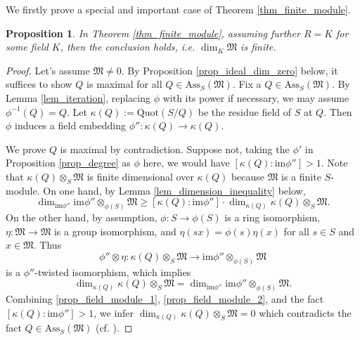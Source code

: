 \documentclass[12pt]{amsart}
\theoremstyle{plain}
\newtheorem{proposition}[theorem]{Proposition}
\theoremstyle{definition}
\theoremstyle{question}
\theoremstyle{remark}
\theoremstyle{assumption}
\numberwithin{equation}{section}
\theoremstyle{bigthm}
\begin{document}
We firstly prove a special and important case of Theorem \ref{thm_finite_module}.
\begin{proposition}\label{prop_field_module}
In Theorem \ref{thm_finite_module}, assuming further $R=K$ for some field $K$, then the conclusion holds, i.e. $\dim_{K} \mathfrak{M}$ is finite.
\end{proposition}
\begin{proof}
Let's assume $\mathfrak{M} \neq 0$. By Proposition \ref{prop_ideal_dim_zero} below, it suffices to show $Q$ is maximal for all $Q \in \mathrm{Ass}_{S} (\mathfrak{M})$. Fix a $Q \in \mathrm{Ass}_{S} (\mathfrak{M})$. By Lemma \ref{lem_iteration}, replacing $\phi$ with its power if necessary, we may assume $\phi^{-1} (Q) =Q$. Let $\kappa (Q) := \mathrm{Quot} (S/Q)$ be the residue field of $S$ at $Q$. Then $\phi$ induces a field embedding $\phi'' \colon  \kappa (Q) \rightarrow \kappa (Q)$.

We prove $Q$ is maximal by contradiction. Suppose not, taking the $\phi'$ in Proposition \ref{prop_degree} as $\phi$ here, we would have $[\kappa (Q): \mathrm{im} \phi''] >1$. Note that $\kappa (Q) \otimes_{S} \mathfrak{M}$ is finite dimensional over $\kappa (Q)$ because $\mathfrak{M}$ is a finite $S$-module. On one hand, by Lemma \ref{lem_dimension_inequality} below,
\begin{equation}\label{prop_field_module_1}
\dim_{\mathrm{im} \phi''} \mathrm{im} \phi'' \otimes_{\phi (S)} \mathfrak{M} \geq [\kappa (Q): \mathrm{im} \phi''] \cdot \dim_{\kappa (Q)} \kappa (Q) \otimes_{S} \mathfrak{M}.
\end{equation}
On the other hand, by assumption, $\phi \colon  S \rightarrow \phi (S)$ is a ring isomorphism, $\eta \colon  \mathfrak{M} \rightarrow \mathfrak{M}$ is a group isomorphism, and $\eta (sx) = \phi (s) \eta (x)$ for all $s \in S$ and $x \in \mathfrak{M}$. Thus
\[
\phi'' \otimes \eta \colon  \kappa (Q) \otimes_{S} \mathfrak{M} \rightarrow \mathrm{im} \phi'' \otimes_{\phi (S)} \mathfrak{M}
\]
is a $\phi''$-twisted isomorphism, which implies
\begin{equation}\label{prop_field_module_2}
\dim_{\kappa (Q)} \kappa (Q) \otimes_{S} \mathfrak{M} = \dim_{\mathrm{im} \phi''} \mathrm{im} \phi'' \otimes_{\phi (S)} \mathfrak{M}.
\end{equation}
Combining \eqref{prop_field_module_1}, \eqref{prop_field_module_2}, and the fact $[\kappa (Q): \mathrm{im} \phi''] >1$, we infer $\dim_{\kappa (Q)} \kappa (Q) \otimes_{S} \mathfrak{M} =0$ which contradicts the fact $Q \in \mathrm{Ass}_{S} (\mathfrak{M})$ (cf. \cite[(7.D)]{Matsumura1}).
\end{proof}
\end{document}
